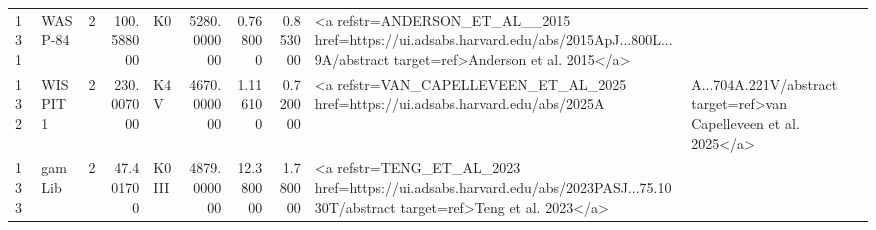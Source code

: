 \begin{tabular}{llrrlrrrl}
131 & WASP-84 & 2 & 100.588000 & K0 & 5280.000000 & 0.768000 & 0.853000 & <a refstr=ANDERSON_ET_AL__2015 href=https://ui.adsabs.harvard.edu/abs/2015ApJ...800L...9A/abstract target=ref>Anderson et al. 2015</a> \\
132 & WISPIT 1 & 2 & 230.007000 & K4 V & 4670.000000 & 1.116100 & 0.720000 & <a refstr=VAN_CAPELLEVEEN_ET_AL_2025 href=https://ui.adsabs.harvard.edu/abs/2025A&A...704A.221V/abstract target=ref>van Capelleveen et al. 2025</a> \\
133 & gam Lib & 2 & 47.401700 & K0 III & 4879.000000 & 12.380000 & 1.780000 & <a refstr=TENG_ET_AL_2023 href=https://ui.adsabs.harvard.edu/abs/2023PASJ...75.1030T/abstract target=ref>Teng et al. 2023</a> \\
\bottomrule
\end{tabular}
